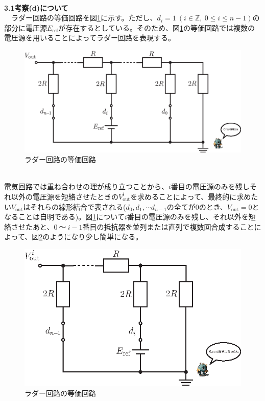 \documentclass[a4paper,10.5pt]{ltjsarticle}
\begin{document}
\clearpage
\hspace{-2pt}{\Large \bfseries 3.追加の考察}\\
{\large \bfseries 3.1考察(d)について}\\
　ラダー回路の等価回路を図\ref{radder1}に示す。ただし、$d_i=1\ ( i\in \mathbb{Z},\ 0\leq i\leq n-1)$の部分に電圧源$E_\mathrm{ref}$が存在するとしている。そのため、図\ref{radder1}の等価回路では複数の電圧源を用いることによってラダー回路を表現する。
\begin{figure}[h]
  \centering
  \includegraphics{figure1.eps}
  \vspace{10pt}\caption{ラダー回路の等価回路}
  \label{radder1}
\end{figure}\\
電気回路では重ね合わせの理が成り立つことから、$i$番目の電圧源のみを残しそれ以外の電圧源を短絡させたときの$V^i_\mathrm{out}$を求めることによって、最終的に求めたい$V_\mathrm{out}$はそれらの線形結合で表される($d_0,d_1,\cdots d_{n-1}$の全てが$0$のとき、$V_\mathrm{out}=0$となることは自明である)。図\ref{radder1}について$i$番目の電圧源のみを残し、それ以外を短絡させたあと、$0\ 〜\ i-1$番目の抵抗器を並列または直列で複数回合成することによって、図\ref{radder2}のようになり少し簡単になる。
\begin{figure}[h]
  \centering
  \includegraphics{figure2.eps}
  \vspace{10pt}\caption{ラダー回路の等価回路}
  \label{radder2}
\end{figure}\\
\end{document}
